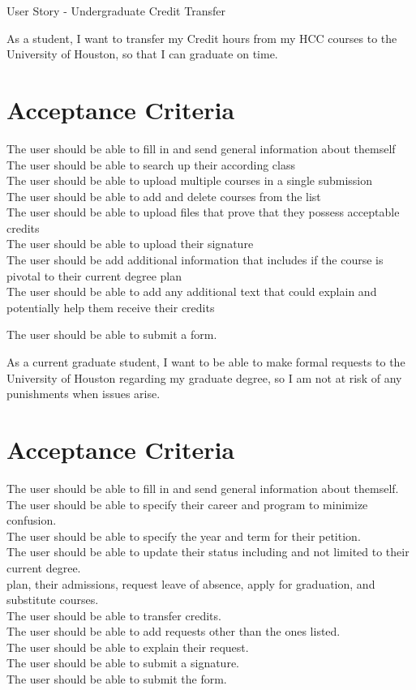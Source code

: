 \documentclass[10pt]{article}
\begin{document}
User Story - Undergraduate Credit Transfer

As a student, I want to transfer my Credit hours from my HCC courses to the University of Houston, so that I can graduate on time.

\section*{Acceptance Criteria}
The user should be able to fill in and send general information about themself\\
The user should be able to search up their according class\\
The user should be able to upload multiple courses in a single submission\\
The user should be able to add and delete courses from the list\\
The user should be able to upload files that prove that they possess acceptable credits\\
The user should be able to upload their signature\\
The user should be add additional information that includes if the course is pivotal to their current degree plan\\
The user should be able to add any additional text that could explain and potentially help them receive their credits

The user should be able to submit a form.

As a current graduate student, I want to be able to make formal requests to the University of Houston regarding my graduate degree, so I am not at risk of any punishments when issues arise.

\section*{Acceptance Criteria}
The user should be able to fill in and send general information about themself.\\
The user should be able to specify their career and program to minimize confusion.\\
The user should be able to specify the year and term for their petition.\\
The user should be able to update their status including and not limited to their current degree.\\
plan, their admissions, request leave of absence, apply for graduation, and substitute courses.\\
The user should be able to transfer credits.\\
The user should be able to add requests other than the ones listed.\\
The user should be able to explain their request.\\
The user should be able to submit a signature.\\
The user should be able to submit the form.
\end{document}
